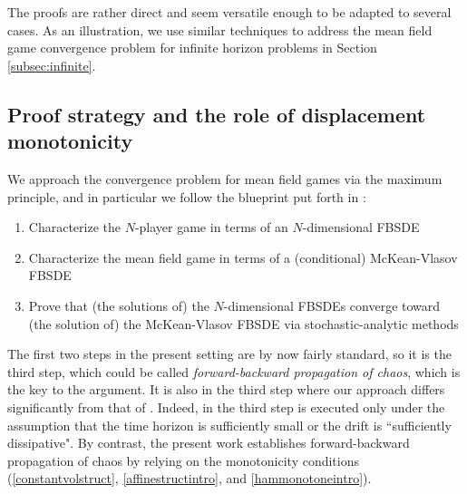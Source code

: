 \documentclass[11pt,reqno]{amsart}
\numberwithin{equation}{section}
\theoremstyle{definition}
\begin{document}
The proofs are rather direct and seem versatile enough to be adapted to several cases.
As an illustration, we use similar techniques to address the mean field game convergence problem for infinite horizon problems in Section \ref{subsec:infinite}.

\subsection{Proof strategy and the role of displacement monotonicity}  \label{subsec:proofstrategy}

We approach the convergence problem for mean field games via the maximum principle, and in particular we follow the blueprint put forth in \cite{laurieretangpi}: 
\begin{enumerate}
\item Characterize the $N$-player game in terms of an $N$-dimensional FBSDE
\item Characterize the mean field game in terms of a (conditional) McKean-Vlasov FBSDE
\item Prove that (the solutions of) the $N$-dimensional FBSDEs converge toward (the solution of) the McKean-Vlasov FBSDE via stochastic-analytic methods
\end{enumerate}
The first two steps in the present setting are by now fairly standard, so it is the third step, which could be called \textit{forward-backward propagation of chaos}, which is the key to the argument. It is also in the third step where our approach differs significantly from that of \cite{laurieretangpi}. Indeed, in \cite{laurieretangpi} the third step is executed only under the assumption that the time horizon is sufficiently small or the drift is ``sufficiently dissipative". By contrast, the present work establishes forward-backward propagation of chaos by relying on the monotonicity conditions (\eqref{constantvolstruct}, \eqref{affinestructintro}, and \eqref{hammonotoneintro}).
\end{document}

